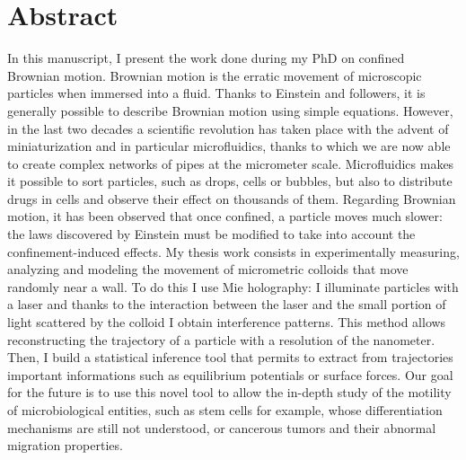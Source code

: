 \section*{Abstract}
In this manuscript, I present the work done during my PhD on confined Brownian motion. Brownian motion is the erratic movement of microscopic particles when immersed into a fluid. Thanks to Einstein and followers, it is generally possible to describe Brownian motion using simple equations. However, in the last two decades a scientific revolution has taken place with the advent of miniaturization and in particular microfluidics, thanks to which we are now able to create complex networks of pipes at the micrometer scale. Microfluidics makes it possible to sort particles, such as drops, cells or bubbles, but also to distribute drugs in cells and observe their effect on thousands of them. Regarding Brownian motion, it has been observed that once confined, a particle moves much slower: the laws discovered by Einstein must be modified to take into account the confinement-induced effects.
My thesis work consists in experimentally measuring, analyzing and modeling the movement of micrometric colloids that move randomly near a wall. To do this I use Mie holography: I illuminate particles with a laser and thanks to the interaction between the laser and the small portion of light scattered by the colloid I obtain interference patterns. This method allows reconstructing the trajectory of a particle with a resolution of the nanometer. Then, I build a statistical inference tool that permits to extract from trajectories important informations such as equilibrium potentials or surface forces.  Our goal for the future is to use this novel tool to allow the in-depth study of the motility of microbiological entities, such as stem cells for example, whose differentiation mechanisms are still not understood, or cancerous tumors and their abnormal migration properties.

